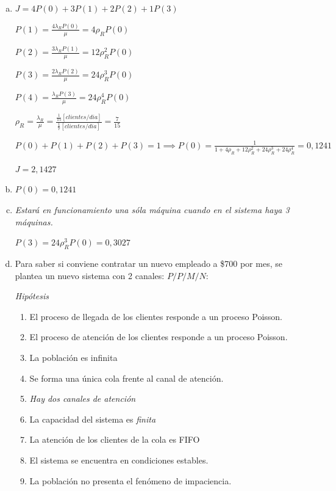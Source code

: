 \documentclass[a4paper,11pt]{article}
\begin{document}
\vspace{13pt}
\leftskip=36pt
\parindent=-18pt
\begin{enumerate}[a)]
  \item
    $J = 4P(0) + 3P(1) + 2P(2) + 1P(3)$

    $P(1) = \frac{4\lambda_R P(0)}{\mu} = 4\rho_R P(0)$

    $P(2) = \frac{3\lambda_R P(1)}{\mu} = 12\rho_R^2 P(0)$

    $P(3) = \frac{2\lambda_R P(2)}{\mu} = 24\rho_R^3 P(0)$

    $P(4) = \frac{\lambda_R P(3)}{\mu} = 24\rho_R^4 P(0)$

    $\rho_R = \frac{\lambda_R}{\mu} = \frac{\frac{1}{15}[clientes/dia]}{\frac{1}{7}[clientes/dia]} = \frac{7}{15}$

    $P(0) + P(1) + P(2) +P(3) = 1 \implies P(0) =
    \frac{1}{1+4\rho_R+12\rho_R^2+24\rho_R^3+24\rho_R^4} = 0,1241$

    $J = 2,1427$

  \vspace{13pt}
  \item
    $P(0) = 0,1241$

  \vspace{13pt}
  \item \textit{Estará en funcionamiento una sóla máquina cuando en el sistema haya 3 máquinas.}

    $P(3) = 24\rho_R^3 P(0) = 0,3027$

  \vspace{13pt}
  \item Para saber si conviene contratar un nuevo empleado a \$700 por mes, se
    plantea un nuevo sistema con 2 canales: $P/P/M/N$:

    \vspace{21pt}
    \leftskip=0pt
    \parindent=0pt
    \textit{Hipótesis}

    \leftskip=36pt
    \parindent=-18pt
    \begin{enumerate}[1.]
      \item El proceso de llegada de los clientes responde a un proceso Poisson.
      \item El proceso de atención de los clientes responde a un proceso Poisson.
      \item La población es infinita
      \item Se forma una única cola frente al canal de atención.
      \item \textit{Hay dos canales de atención}
      \item La capacidad del sistema es \textit{finita}
      \item La atención de los clientes de la cola es FIFO
      \item El sistema se encuentra en condiciones estables.
      \item La población no presenta el fenómeno de impaciencia.
    \end{enumerate}


\end{enumerate}
\end{document}
